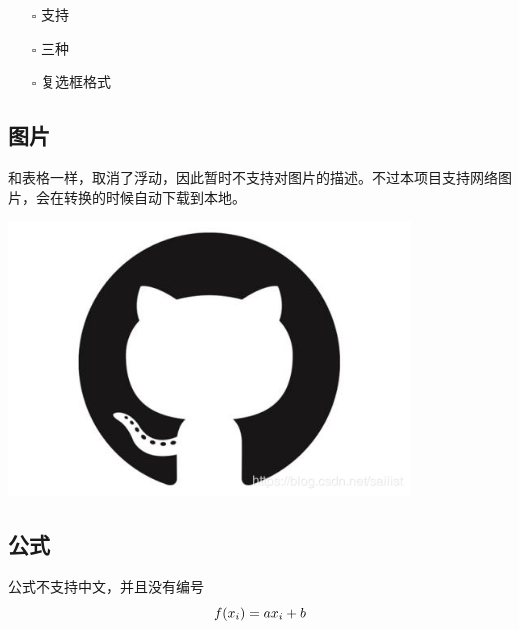 \documentclass[UTF8]{ctexart}
\newenvironment{marktext}{}{}
\begin{document}
\begin{itemize}
\item[\rlap{\raisebox{0.3ex}{\hspace{0.4ex}\tiny \ding{52}}}$\square$]
支持
\item[\rlap{\raisebox{0.3ex}{\hspace{0.4ex}\scriptsize \ding{56}}}$\square$]
三种
\item[$\square$]
复选框格式
\end{itemize}
\begin{marktext}


\subsection{图片}


和表格一样，取消了浮动，因此暂时不支持对图片的描述。不过本项目支持网络图片，会在转换的时候自动下载到本地。


\begin{center}
\begin{marktext}
\vspace{\baselineskip}\includegraphics[width=0.8\textwidth]{images/1c59f8ef2aa3c5e527a22b7c258489d6.png}\vspace{\baselineskip}
\end{marktext}
\end{center}


\subsection{公式}


公式不支持中文，并且没有编号
\end{marktext}
\[
\\ f(x_i)=ax_i+b\\ \\
\]
\end{document}
